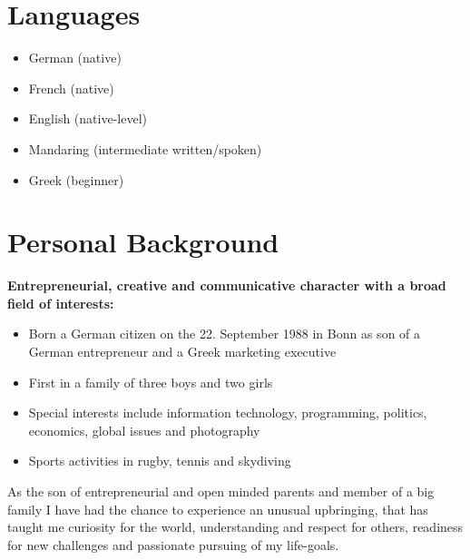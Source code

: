 \documentclass[margin]{res}
\begin{document}
\begin{resume}
\section{Languages}
  \begin{itemize} \itemsep -0.5pt 
  \item German (native)
  \item French (native)
  \item English (native-level)
  \item Mandaring (intermediate written/spoken)
  \item Greek (beginner)
  \end{itemize}

\section{Personal Background}
{\bf Entrepreneurial, creative and communicative character with a broad field of interests:}
  \begin{itemize} \itemsep -0.5pt 
  \item Born a German citizen on the 22. September 1988 in Bonn as son of a German entrepreneur and a Greek marketing executive
  \item First in a family of three boys and two girls
  \item Special interests include information technology, programming, politics, economics, global issues and photography
  \item Sports activities in rugby, tennis and skydiving
  \end{itemize}

As the son of entrepreneurial and open minded parents and member of a big family I have had the chance to experience an unusual upbringing, that has taught me curiosity for the world, understanding and respect for others, readiness for new challenges and passionate pursuing of my life-goals.

\end{resume} 
\end{document}
